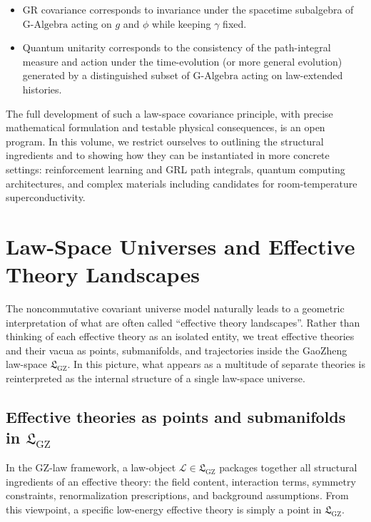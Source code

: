 \documentclass[11pt]{book}
\newcommand{\GAlgebra}{\text{G-Algebra}}
\newcommand{\GZLS}{\ensuremath{\mathfrak{L}_{\mathrm{GZ}}}}
\theoremstyle{plain}
\theoremstyle{definition}
\theoremstyle{remark}
\begin{document}
\begin{itemize}
  \item GR covariance corresponds to invariance under the spacetime
        subalgebra of $\GAlgebra$ acting on $g$ and $\phi$ while
        keeping $\gamma$ fixed.
  \item Quantum unitarity corresponds to the consistency of the
        path-integral measure and action under the time-evolution
        (or more general evolution) generated by a distinguished
        subset of $\GAlgebra$ acting on law-extended histories.
\end{itemize}

The full development of such a law-space covariance principle, with
precise mathematical formulation and testable physical consequences,
is an open program. In this volume, we restrict ourselves to
outlining the structural ingredients and to showing how they can be
instantiated in more concrete settings: reinforcement learning and
GRL path integrals, quantum computing architectures, and complex
materials including candidates for room-temperature superconductivity.



\section{Law-Space Universes and Effective Theory Landscapes}
\label{sec:lawspace-universes-landscapes}


The noncommutative covariant universe model naturally leads to a
geometric interpretation of what are often called ``effective theory
landscapes''. Rather than thinking of each effective theory as an
isolated entity, we treat effective theories and their vacua as
points, submanifolds, and trajectories inside the GaoZheng law-space
$\GZLS$. In this picture, what appears as a multitude of separate
theories is reinterpreted as the internal structure of a single
law-space universe.

\subsection{Effective theories as points and submanifolds in \texorpdfstring{$\GZLS$}{GZ-LS}}
\label{subsec:effective-theories-GZLS}


In the GZ-law framework, a law-object $\mathcal{L} \in \GZLS$
packages together all structural ingredients of an effective theory:
the field content, interaction terms, symmetry constraints,
renormalization prescriptions, and background assumptions. From this
viewpoint, a specific low-energy effective theory is simply a point
in $\GZLS$.
\end{document}
